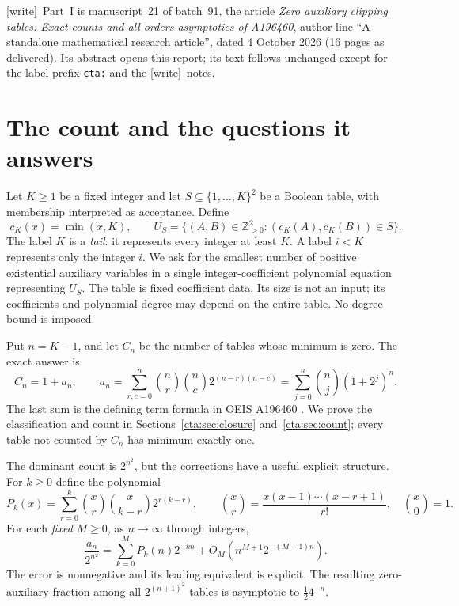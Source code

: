 \documentclass[11pt]{article}
\theoremstyle{definition}
\theoremstyle{remark}
\newcommand{\Npos}{\mathbb Z_{>0}}
\newcommand{\wtag}{\textup{[write]}}
\begin{document}
\wtag\ Part~I is manuscript~21 of batch~91, the article \emph{Zero
auxiliary clipping tables: Exact counts and all orders asymptotics of
A196460}, author line ``A standalone mathematical research article'',
dated 4 October 2026 (16 pages as delivered). Its abstract opens this
report; its text follows unchanged except for the label prefix
\texttt{cta:} and the \wtag\ notes.

\section{The count and the questions it answers}\label{cta:sec:intro}

Let $K\geq1$ be a fixed integer and let $S\subseteq\{1,\ldots,K\}^2$ be a
Boolean table, with membership interpreted as acceptance. Define
\[
 c_K(x)=\min(x,K),\qquad
 U_S=\{(A,B)\in\Npos^2:(c_K(A),c_K(B))\in S\}.
\]
The label $K$ is a \emph{tail}: it represents every integer at least $K$.
A label $i<K$ represents only the integer $i$. We ask for the smallest
number of positive existential auxiliary variables in a single
integer-coefficient polynomial equation representing $U_S$. The table is
fixed coefficient data. Its size is not an input; its coefficients and
polynomial degree may depend on the entire table. No degree bound is imposed.

Put $n=K-1$, and let $C_n$ be the number of tables whose minimum is zero.
The exact answer is
\begin{equation}\label{cta:eq:count}
 C_n=1+a_n,\qquad
 a_n=\sum_{r,c=0}^n\binom nr\binom nc2^{(n-r)(n-c)}
     =\sum_{j=0}^n\binom nj(1+2^j)^n.
\end{equation}
The last sum is the defining term formula in OEIS A196460
\cite{oeis}. We prove the classification and count in Sections~\ref{cta:sec:closure}
and~\ref{cta:sec:count}; every table not counted by $C_n$ has minimum exactly one.

The dominant count is $2^{n^2}$, but the corrections have a useful explicit
structure. For $k\geq0$ define the polynomial
\begin{equation}\label{cta:eq:P}
 P_k(x)=\sum_{r=0}^k\binom xr\binom{x}{k-r}2^{r(k-r)},
 \qquad
 \binom xr=\frac{x(x-1)\cdots(x-r+1)}{r!},\quad \binom x0=1.
\end{equation}
For each \emph{fixed} $M\geq0$, as $n\to\infty$ through integers,
\begin{equation}\label{cta:eq:mainforward}
 \frac{a_n}{2^{n^2}}
 =\sum_{k=0}^M P_k(n)2^{-kn}
   +O_M\!\left(n^{M+1}2^{-(M+1)n}\right).
\end{equation}
The error is nonnegative and its leading equivalent is explicit.
The resulting zero-auxiliary fraction among all $2^{(n+1)^2}$ tables is
asymptotic to $\tfrac12 4^{-n}$.
\end{document}

